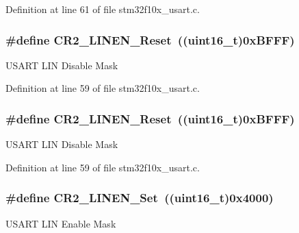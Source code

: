 Definition at line 61 of file stm32f10x\+\_\+usart.\+c.

\subsubsection[{\texorpdfstring{C\+R2\+\_\+\+L\+I\+N\+E\+N\+\_\+\+Reset}{CR2_LINEN_Reset}}]{\setlength{\rightskip}{0pt plus 5cm}\#define C\+R2\+\_\+\+L\+I\+N\+E\+N\+\_\+\+Reset~(({\bf uint16\+\_\+t})0x\+B\+F\+F\+F)}\hypertarget{group___u_s_a_r_t___private___defines_ga7b8fbe7be4c85c16ea1c1e3c9fa95b05}{}\label{group___u_s_a_r_t___private___defines_ga7b8fbe7be4c85c16ea1c1e3c9fa95b05}
U\+S\+A\+RT L\+IN Disable Mask 

Definition at line 59 of file stm32f10x\+\_\+usart.\+c.

\subsubsection[{\texorpdfstring{C\+R2\+\_\+\+L\+I\+N\+E\+N\+\_\+\+Reset}{CR2_LINEN_Reset}}]{\setlength{\rightskip}{0pt plus 5cm}\#define C\+R2\+\_\+\+L\+I\+N\+E\+N\+\_\+\+Reset~(({\bf uint16\+\_\+t})0x\+B\+F\+F\+F)}\hypertarget{group___u_s_a_r_t___private___defines_ga7b8fbe7be4c85c16ea1c1e3c9fa95b05}{}\label{group___u_s_a_r_t___private___defines_ga7b8fbe7be4c85c16ea1c1e3c9fa95b05}
U\+S\+A\+RT L\+IN Disable Mask 

Definition at line 59 of file stm32f10x\+\_\+usart.\+c.

\subsubsection[{\texorpdfstring{C\+R2\+\_\+\+L\+I\+N\+E\+N\+\_\+\+Set}{CR2_LINEN_Set}}]{\setlength{\rightskip}{0pt plus 5cm}\#define C\+R2\+\_\+\+L\+I\+N\+E\+N\+\_\+\+Set~(({\bf uint16\+\_\+t})0x4000)}\hypertarget{group___u_s_a_r_t___private___defines_gabc3f2b022d70a11fd0605e58cb23023f}{}\label{group___u_s_a_r_t___private___defines_gabc3f2b022d70a11fd0605e58cb23023f}
U\+S\+A\+RT L\+IN Enable Mask 

